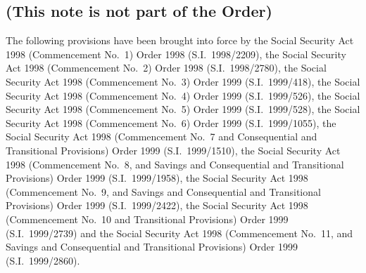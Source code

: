 \documentclass[12pt,a4paper]{article}
\begin{document}
\subsection*{(This note is not part of the Order)}

The following provisions have been brought into force by the Social Security Act 1998 (Commencement No.\ 1) Order 1998 (S.I.\ 1998/2209), the Social Security Act 1998 (Commencement No.\ 2) Order 1998 (S.I.\ 1998/2780), the Social Security Act 1998 (Commencement No.\ 3) Order 1999 (S.I.\ 1999/418), the Social Security Act 1998 (Commencement No.\ 4) Order 1999 (S.I.\ 1999/526), the Social Security Act 1998 (Commencement No.\ 5) Order 1999 (S.I.\ 1999/528), the Social Security Act 1998 (Commencement No.\ 6) Order 1999 (S.I.\ 1999/1055), the Social Security Act 1998 (Commencement No.\ 7 and Consequential and Transitional Provisions) Order 1999 (S.I.\ 1999/1510), the Social Security Act 1998 (Commencement No.\ 8, and Savings and Consequential and Transitional Provisions) Order 1999 (S.I.\ 1999/1958), the Social Security Act 1998 (Commencement No.\ 9, and Savings and Consequential and Transitional Provisions) Order 1999 (S.I.\ 1999/2422), the Social Security Act 1998 (Commencement No.\ 10 and Transitional Provisions) Order 1999 (S.I.\ 1999/2739) and the Social Security Act 1998 (Commencement No.\ 11, and Savings and Consequential and Transitional Provisions) Order 1999 (S.I.\ 1999/2860). 
\end{document}

